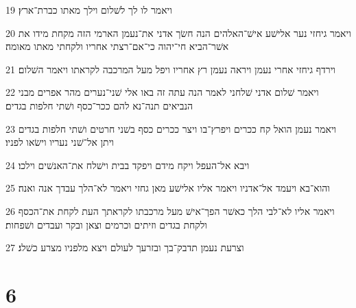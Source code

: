 \par 19 ויאמר לו לך לשׁלום וילך מאתו כברת־ארץ׃
\par 20 ויאמר גיחזי נער אלישׁע אישׁ־האלהים הנה חשׂך אדני את־נעמן הארמי הזה מקחת מידו את אשׁר־הביא חי־יהוה כי־אם־רצתי אחריו ולקחתי מאתו מאומה׃
\par 21 וירדף גיחזי אחרי נעמן ויראה נעמן רץ אחריו ויפל מעל המרכבה לקראתו ויאמר השׁלום׃
\par 22 ויאמר שׁלום אדני שׁלחני לאמר הנה עתה זה באו אלי שׁני־נערים מהר אפרים מבני הנביאים תנה־נא להם ככר־כסף ושׁתי חלפות בגדים׃
\par 23 ויאמר נעמן הואל קח ככרים ויפרץ־בו ויצר ככרים כסף בשׁני חרטים ושׁתי חלפות בגדים ויתן אל־שׁני נעריו וישׂאו לפניו׃
\par 24 ויבא אל־העפל ויקח מידם ויפקד בבית וישׁלח את־האנשׁים וילכו׃
\par 25 והוא־בא ויעמד אל־אדניו ויאמר אליו אלישׁע מאן גחזי ויאמר לא־הלך עבדך אנה ואנה׃
\par 26 ויאמר אליו לא־לבי הלך כאשׁר הפך־אישׁ מעל מרכבתו לקראתך העת לקחת את־הכסף ולקחת בגדים וזיתים וכרמים וצאן ובקר ועבדים ושׁפחות׃
\par 27 וצרעת נעמן תדבק־בך ובזרעך לעולם ויצא מלפניו מצרע כשׁלג׃

\chapter{6}

